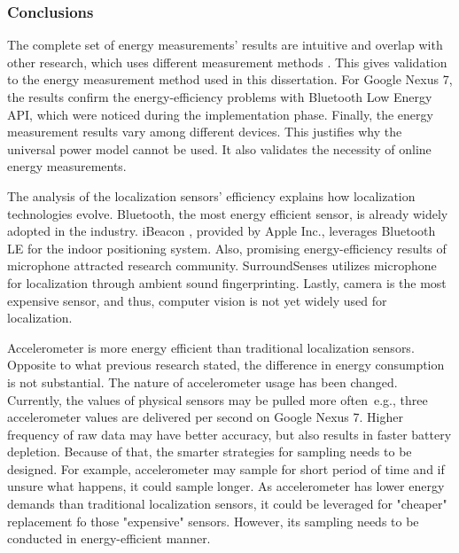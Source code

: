 
\subsubsection{Conclusions}
\hspace{10pt} The complete set of energy measurements' results are intuitive and overlap with other research, which uses different measurement methods \cite{constandache:localization} \cite{wang:eemss} \cite{chon:smartdc}. This gives validation to the energy measurement method used in this dissertation. For Google Nexus 7, the results confirm the energy-efficiency problems with Bluetooth Low Energy API, which were noticed during the implementation phase. Finally, the energy measurement results vary among different devices. This justifies why the universal power model cannot be used. It also validates the necessity of online energy measurements. 

The analysis of the localization sensors' efficiency explains how localization technologies evolve. Bluetooth, the most energy efficient sensor, is already widely adopted in the industry. iBeacon \cite{apple:ibeacon}, provided by Apple Inc.,  leverages Bluetooth LE for the indoor positioning system. Also, promising energy-efficiency results of microphone attracted research community. SurroundSenses \cite{azizyan:surroundsense} utilizes microphone for localization through ambient sound fingerprinting. Lastly, camera is the most expensive sensor, and thus, computer vision is not yet widely used for localization.

Accelerometer is more energy efficient than traditional localization sensors. Opposite to what previous research\cite{benabdesslem:senseless} stated, the difference in energy consumption is not substantial. The nature of accelerometer usage has been changed. Currently, the values of physical sensors may be pulled more often\ e.g., three accelerometer values are delivered per second on Google Nexus 7. Higher frequency of raw data may have better accuracy, but also results in faster battery depletion.  Because of that, the smarter strategies for sampling needs to be designed. For example, accelerometer may sample for short period of time and if unsure what happens, it could sample longer. As accelerometer has lower energy demands than traditional localization sensors, it could be leveraged for "cheaper" replacement fo those "expensive" sensors. However, its sampling needs to be conducted in energy-efficient manner. 

